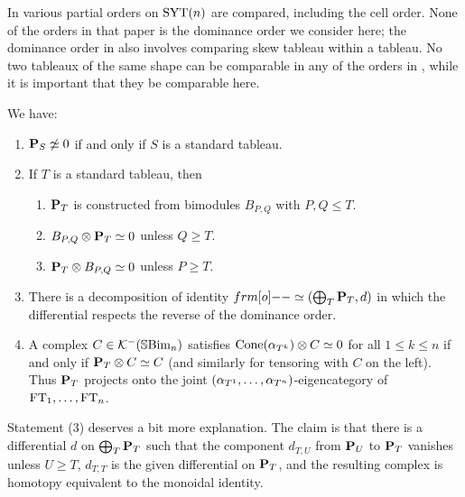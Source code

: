 \begin{remark} In \cite{Taskin} various partial orders on $\operatorname{SYT}(n)$ are compared, including the cell order. None of the orders in that paper is the dominance order we consider here; the dominance order in \cite{Taskin} also involves comparing skew tableau within a tableau. No two tableaux of the same shape can be comparable in any of the orders in \cite{Taskin}, while it is important that they be comparable here. \end{remark}

\begin{theorem}\label{thm:PTprops}
We have:
\begin{enumerate}\setlength{\itemsep}{2pt}
\item ${\mathbf P}_S\not \simeq 0$ if and only if $S$ is a standard tableau.
\item If $T$ is a standard tableau, then
\begin{enumerate}\setlength{\itemsep}{2pt}
\item  ${\mathbf P}_T$ is constructed from bimodules $B_{P,Q}$ with $P,Q\leq T$.
\item  $B_{P,Q}\otimes {\mathbf P}_T \simeq 0$ unless $Q\geq T$.
 \item ${\mathbf P}_T\otimes B_{P,Q}\simeq 0$ unless $P\geq T$.
 \end{enumerate}
 \item There is a decomposition of identity $\one\simeq (\bigoplus_T \PB_T, d)$ in which the differential respects the reverse of the dominance order.
 \item A complex $C\in {\mathcal{K}}^-({\mathbb{S}}{\rm Bim }_n)$ satisfies $\operatorname{Cone}(\alpha_{T^k})\otimes C\simeq 0$ for all $1\leq k\leq n$ if and only if ${\mathbf P}_T\otimes C\simeq C$ (and similarly for tensoring with $C$ on the left).  Thus ${\mathbf P}_T$ projects onto the joint $(\alpha_{T^1},\ldots,\alpha_{T^n})$-eigencategory of $\operatorname{FT}_1,\ldots,\operatorname{FT}_n$.
\end{enumerate}
\end{theorem}

Statement (3) deserves a bit more explanation.  The claim is that there is a differential $d$ on $\bigoplus_T {\mathbf P}_T$ such that the component $d_{T,U}$ from ${\mathbf P}_U$ to ${\mathbf P}_T$ vanishes unless $U\geq T$, $d_{T,T}$ is the given differential on ${\mathbf P}_T$, and the resulting complex is homotopy equivalent to the monoidal identity.

